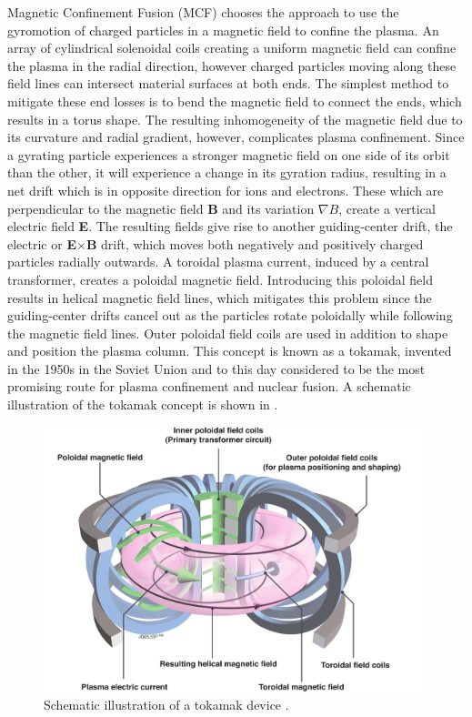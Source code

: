 Magnetic Confinement Fusion (MCF) chooses the approach to use the gyromotion of charged particles in a magnetic field to confine the plasma. An array of cylindrical solenoidal coils creating a uniform magnetic field can confine the plasma in the radial direction, however charged particles moving along these field lines can intersect material surfaces at both ends. The simplest method to mitigate these end losses is to bend the magnetic field to connect the ends, which results in a torus shape. The resulting inhomogeneity of the magnetic field due to its curvature and radial gradient, however, complicates plasma confinement. Since a gyrating particle experiences a stronger magnetic field on one side of its orbit than the other, it will experience a change in its gyration radius, resulting in a net drift which is in opposite direction for ions and electrons. These  which are perpendicular to the magnetic field \textbf{B} and its variation $\nabla B$, create a vertical electric field \textbf{E}. The resulting fields give rise to another guiding-center drift, the electric or \textbf{E}$\times$\textbf{B} drift, which moves both negatively and positively charged particles radially outwards. A toroidal plasma current, induced by a central transformer, creates a poloidal magnetic field. Introducing this poloidal field results in helical magnetic field lines, which mitigates this problem since the guiding-center drifts cancel out as the particles rotate poloidally while following the magnetic field lines. Outer poloidal field coils are used in addition to shape and position the plasma column. This concept is known as a tokamak, invented in the 1950s in the Soviet Union and to this day considered to be the most promising route for plasma confinement and nuclear fusion. A schematic illustration of the tokamak concept is shown in . 
\begin{figure}[t]
	\centering
	\includegraphics[width=11cm]{figures/tokamak.png}
	\caption{Schematic illustration of a tokamak device \cite{eurofusion}.}
	\label{Fig:tokamak}
\end{figure}

